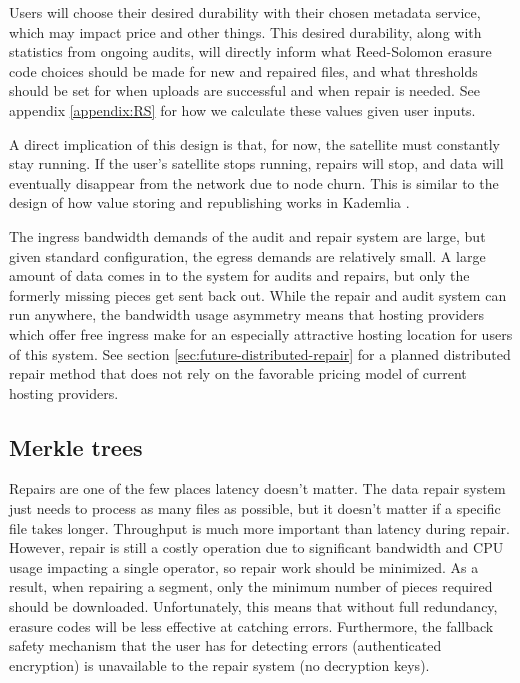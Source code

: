 \documentclass[11pt,fleqn,openany]{book}
\begin{document}
Users will choose their desired durability with their chosen metadata service,
which may impact price and other things. This desired durability, along
with
statistics from ongoing audits, will directly inform what Reed-Solomon erasure
code choices should be made for new and repaired files, and what thresholds
should be set for when uploads are successful and when repair is needed. See
appendix \ref{appendix:RS} for how we calculate these values given user inputs.

A direct implication of this design is that, for now, the satellite must
constantly stay running. If the user's satellite stops running, repairs will
stop, and data will eventually disappear from the network due to node churn.
This is similar to the design of how value storing and republishing works in
Kademlia \cite{kad}.

The ingress bandwidth demands of the audit and repair system are large, but
given standard configuration, the egress demands are relatively small.
A large amount of data comes in to the system for audits and repairs, but only
the formerly missing pieces get sent back out.
While the repair and audit system can run anywhere, the bandwidth usage
asymmetry means that hosting providers which offer free ingress
make for an especially attractive hosting location for users of this system.
See section \ref{sec:future-distributed-repair} for a planned distributed
repair method that
does not rely on the favorable pricing model of current hosting providers.

\subsection{Merkle trees}

Repairs are one of the few places latency doesn't matter. The data repair system
just needs to process as many files as possible, but it doesn't matter if
a specific file takes longer. Throughput is much more important than
latency during repair. However, repair
is still a costly operation due to significant bandwidth and CPU usage
impacting a single operator, so repair work should be minimized.
As a result, when repairing a segment,
only the minimum number of pieces required should be downloaded.
Unfortunately, this means that
without full redundancy, erasure codes will be less effective at catching
errors. Furthermore, the fallback safety mechanism that the user has for detecting
errors (authenticated encryption) is unavailable to the repair system (no
decryption keys).
\end{document}
